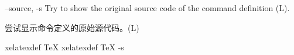 
\begin{docKey}
{--source, -s}{}%
{}%
Try to show the original source code of the command definition (L).

尝试显示命令定义的原始源代码。(L)

\begin{commandshell}
xelatexdef TeX
xelatexdef TeX -s
\end{commandshell}
\end{docKey}